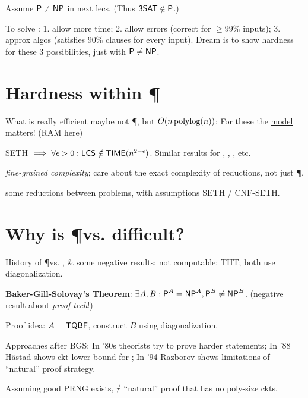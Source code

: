 \documentclass{article}
\begin{document}
Assume $\text{\sf P} \neq \text{\sf NP}$ in next lecs. (Thus $\text{\sf 3SAT} \notin \text{\sf P}$.)
\par
To solve :
1. allow more time;
2. allow errors (correct for $\geq 99\%$ inputs);
3. approx algos (satisfies 90\% clauses for every input).
Dream is to show hardness for these 3 possibilities, just with $\text{\sf P} \neq \text{\sf NP}$.


\section{Hardness within \P}

What is really efficient maybe not \P, but $O(n \operatorname{polylog}(n))$;
For these the \ul{model} matters! (RAM here)
\par
SETH $\implies \forall \epsilon>0: \text{\sf LCS} \notin \text{\sf TIME}(n^{2-\epsilon})$. Similar results for , , , etc.
\par
\textit{fine-grained complexity};
care about the exact complexity of reductions, not just \P.
\par
some reductions between problems, with assumptions SETH / CNF-SETH.


\section{Why is \P vs. \NP difficult?}

History of \P vs. \NP, \& some negative results:  not computable; THT; both use diagonalization.
\par
\textbf{Baker-Gill-Solovay's Theorem}: $\exists A, B: \text{\sf P}^A = \text{\sf NP}^A, \text{\sf P}^B \neq \text{\sf NP}^B$. (negative result about \textit{proof tech}!)
\par
Proof idea: $A = \text{\sf TQBF}$, construct $B$ using diagonalization.
\par
Approaches after BGS:
In '80s theorists try to prove harder statements;
In '88 Hästad shows ckt lower-bound for ;
In '94 Razborov shows limitations of ``natural'' proof strategy.
\par
Assuming good PRNG exists, $\nexists$ ``natural'' proof that \NP has no poly-size ckts.
\end{document}
